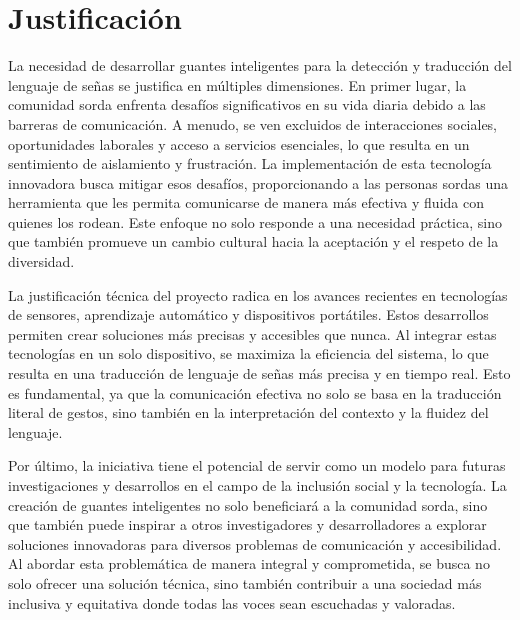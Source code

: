 \section{Justificación}

La necesidad de desarrollar guantes inteligentes para la detección y traducción del lenguaje de señas se justifica en múltiples dimensiones. En primer lugar, la comunidad sorda enfrenta desafíos significativos en su vida diaria debido a las barreras de comunicación. A menudo, se ven excluidos de interacciones sociales, oportunidades laborales y acceso a servicios esenciales, lo que resulta en un sentimiento de aislamiento y frustración. La implementación de esta tecnología innovadora busca mitigar esos desafíos, proporcionando a las personas sordas una herramienta que les permita comunicarse de manera más efectiva y fluida con quienes los rodean. Este enfoque no solo responde a una necesidad práctica, sino que también promueve un cambio cultural hacia la aceptación y el respeto de la diversidad.

La justificación técnica del proyecto radica en los avances recientes en tecnologías de sensores, aprendizaje automático y dispositivos portátiles. Estos desarrollos permiten crear soluciones más precisas y accesibles que nunca. Al integrar estas tecnologías en un solo dispositivo, se maximiza la eficiencia del sistema, lo que resulta en una traducción de lenguaje de señas más precisa y en tiempo real. Esto es fundamental, ya que la comunicación efectiva no solo se basa en la traducción literal de gestos, sino también en la interpretación del contexto y la fluidez del lenguaje. 

Por último, la iniciativa tiene el potencial de servir como un modelo para futuras investigaciones y desarrollos en el campo de la inclusión social y la tecnología. La creación de guantes inteligentes no solo beneficiará a la comunidad sorda, sino que también puede inspirar a otros investigadores y desarrolladores a explorar soluciones innovadoras para diversos problemas de comunicación y accesibilidad. Al abordar esta problemática de manera integral y comprometida, se busca no solo ofrecer una solución técnica, sino también contribuir a una sociedad más inclusiva y equitativa donde todas las voces sean escuchadas y valoradas.
